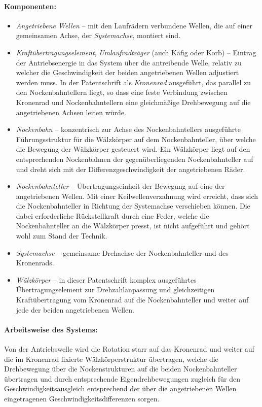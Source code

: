 \documentclass[11pt,a4paper]{article}
\begin{document}
\paragraph{Komponenten:}
\begin{itemize}
\item \emph{Angetriebene Wellen} -- mit den Laufrädern verbundene Wellen, die
  auf einer gemeinsamen Achse, der \emph{Systemachse}, montiert sind. 
\item \emph{Kraftübertragungselement}, \emph{Umlaufradträger} (auch Käfig oder
  Korb) -- Eintrag der Antriebsenergie in das System über die antreibende
  Welle, relativ zu welcher die Geschwindigkeit der beiden angetriebenen
  Wellen adjustiert werden muss.  In der Patentschrift als \emph{Kronenrad}
  ausgeführt, das parallel zu den Nockenbahntellern liegt, so dass eine feste
  Verbindung zwischen Kronenrad und Nockenbahntellern eine gleichmäßige
  Drehbewegung auf die angetriebenen Achsen leiten würde.
\item \emph{Nockenbahn} -- konzentrisch zur Achse des Nockenbahntellers
  ausgeführte Führungs\-struktur für die Wälzkörper auf dem Nockenbahnteller,
  über welche die Bewegung der Wälzkörper gesteuert wird.  Ein Wälzkörper
  liegt auf den entsprechenden Nockenbahnen der gegenüberliegenden
  Nockenbahnteller auf und dreht sich mit der Differenzgeschwindigkeit der
  angetriebenen Räder.
\item \emph{Nockenbahnteller} -- Übertragungseinheit der Bewegung auf eine der
  angetriebenen Wellen. Mit einer Keilwellenverzahnung wird erreicht, dass
  sich die Nockenbahnteller in Richtung der Systemachse verschieben können.
  Die dabei erforderliche Rück\-stell\-kraft durch eine Feder, welche die
  Nockenbahnteller an die Wälzkörper presst, ist nicht aufgeführt und gehört
  wohl zum Stand der Technik.
\item \emph{Systemachse} -- gemeinsame Drehachse der Nockenbahnteller und des
  Kronenrads. 
\item \emph{Wälzkörper} -- in dieser Patentschrift komplex ausgeführtes
  Übertragungselement zur Drehzahlanpassung und gleichzeitigen
  Kraftübertragung vom Kronenrad auf die Nockenbahnteller und weiter auf jede
  der beiden angetriebenen Wellen.
\end{itemize}

\paragraph{Arbeitsweise des Systems:}
Von der Antriebswelle wird die Rotation starr auf das Kronenrad und weiter auf
die im Kronenrad fixierte Wälzkörperstruktur übertragen, welche die
Drehbewegung über die Nockenstrukturen auf die beiden Nockenbahnteller
übertragen und durch entsprechende Eigendrehbewegungen zugleich für den
Geschwindigkeitsausgleich entsprechend der über die angetriebenen Wellen
eingetragenen Geschwindigkeitsdifferenzen sorgen.
\end{document}
